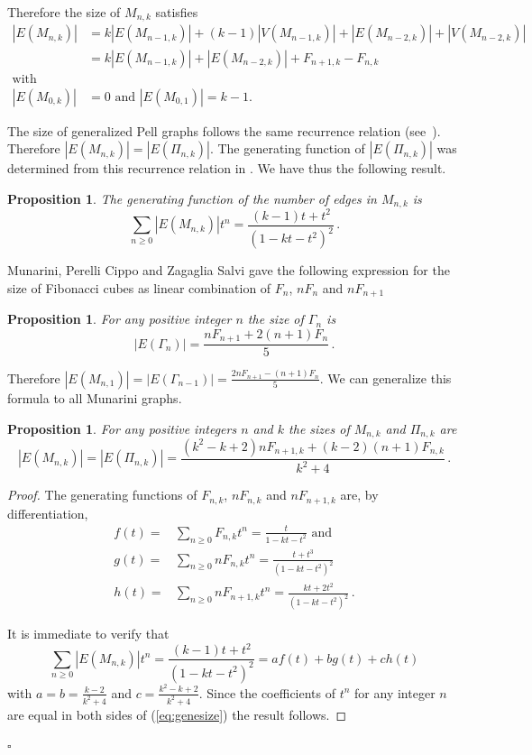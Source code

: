 \documentclass[11pt]{article}
\newtheorem{proposition}[theorem]{\bf Proposition}
\newcommand{\qed}{\hfill $\square$ \bigskip}
\begin{document}
Therefore the size of $M_{n,k}$ satisfies 
\begin{align*}
|E(M_{n,k})|& =k|E(M_{n-1,k})|+(k-1)|V(M_{n-1,k})|+|E(M_{n-2,k})|+|V(M_{n-2,k})|\\
&= k|E(M_{n-1,k})|+|E(M_{n-2,k})|+ F_{n+1,k}-F_{n,k}\\
\text{with}\\
 |E(M_{0,k})|&=0 \text{ and } |E(M_{0,1})|=k-1.
\end{align*}

The size of generalized Pell graphs follows the same recurrence relation (see~\cite{IKT-2023}). Therefore $|E(M_{n,k})|=|E(\Pi_{n,k})|$. The generating function of $|E(\Pi_{n,k})|$ was determined from this recurrence relation in \cite{IKT-2023}. We have thus the following result.
\begin{proposition}
The generating function  of the number of edges in  $M_{n,k}$ is   $$\sum_{n\geq0}{|E(M_{n,k})|t^n}=\frac{(k-1)t+t^2}{(1-kt-t^2)^2}\,.$$
\end{proposition}

Munarini, Perelli Cippo and Zagaglia Salvi gave the following expression for the size of Fibonacci cubes as linear combination of $F_n$, $nF_n$ and $nF_{n+1}$
\begin{proposition}\cite{MPZ-2001}
For any positive integer $n$ the size of $\Gamma_n$ is 
$$|E(\Gamma_n)|=\frac{nF_{n+1}+2(n+1)F_n}{5}\,.
$$
\end{proposition}
Therefore $|E(M_{n,1})|=|E(\Gamma_{n-1})|=\frac{2nF_{n+1}-(n+1)F_n}{5}$. We can generalize this formula to all Munarini graphs.

\begin{proposition}\label{prop:sizelin}
For any positive integers $n$ and $k$ the sizes of $M_{n,k}$ and $\Pi_{n,k}$ are
$$|E(M_{n,k})|=|E(\Pi_{n,k})|=\frac{(k^2-k+2)nF_{n+1,k}+(k-2)(n+1)F_{n,k}}{k^2+4}\,.
$$
\end{proposition}
\begin{proof}
The generating functions of $F_{n,k}$, $nF_{n,k}$ and  $nF_{n+1,k}$ are, by differentiation,
\begin{align*}
f(t)=&\sum_{n\geq0}{F_{n,k}t^n}=\frac{t}{1-kt-t^2} \text{ and} \\ 
g(t)=&\sum_{n\geq0}{nF_{n,k}t^n}=\frac{t+t^3}{(1-kt-t^2)^2}\\
h(t)=&\sum_{n\geq0}{nF_{n+1,k}t^n}=\frac{kt+2t^2}{(1-kt-t^2)^2}\,.
\end{align*}

It is immediate to verify that 
\begin{equation}\label{eq:genesize}
\sum_{n\geq0}{|E(M_{n,k})|t^n}=\frac{(k-1)t+t^2}{(1-kt-t^2)^2}=af(t)+bg(t)+ch(t)
\end{equation}
with $a=b=\frac{k-2}{k^2+4}$ and $c=\frac{k^2-k+2}{k^2+4}$.
Since the coefficients of $t^n$ for any integer $n$ are equal in both sides of (\ref{eq:genesize}) the result follows.
\end{proof}
\qed
\end{document}
